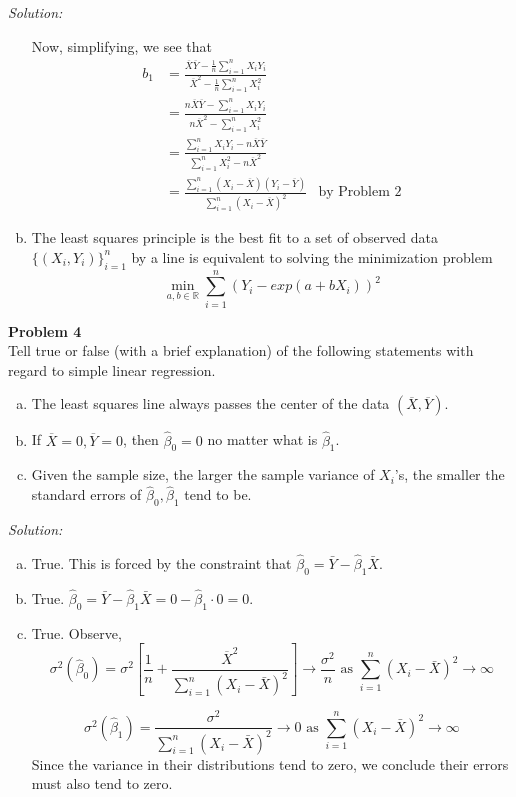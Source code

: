\documentclass{article}
\newenvironment{problem}[2][Problem]
    { \begin{mdframed}[backgroundcolor=gray!20] \textbf{#1 #2} \\}
    {  \end{mdframed}}
\newenvironment{solution}
    {\textit{Solution:}}
    {}
\begin{document}
\begin{solution}
\begin{enumerate}[(a)]
Now, simplifying, we see that 
\begin{align*}
b_1 &= \frac{\overline{X}\overline{Y} - \frac{1}{n}\sum_{i = 1}^n X_i Y_i }{\overline{X}^2 - \frac{1}{n}\sum_{i = 1}^n X_i^2 } \\
&= \frac{n \overline{X}\overline{Y} - \sum_{i = 1}^n X_i Y_i }{n \overline{X}^2 - \sum_{i = 1}^n X_i^2 } \\
&=  \frac{ \sum_{i = 1}^n X_i Y_i - n \overline{X}\overline{Y} }{ \sum_{i = 1}^n X_i^2 - n \overline{X}^2} \\
&=  \frac{\sum_{i = 1}^n (X_i - \overline{X}) (Y_i - \overline{Y})}{ \sum_{i = 1}^n (X_i - \overline{X})^2} & \text{by Problem 2}
\end{align*}
\item The least squares principle is the best fit to a set of observed data $\{ (X_i, Y_i) \}_{i = 1}^n$ by a line is equivalent to solving the minimization problem 
$$\min_{a, b \in \mathbb R} \sum_{i = 1}^n (Y_i - exp(a + b X_i))^2$$
\end{enumerate}
\end{solution}


\begin{problem}{4}
Tell true or false (with a brief explanation) of the following statements with regard to
simple linear regression.
\begin{enumerate}[(a)]
\item The least squares line always passes the center of the data $(\overline{X} , \overline{Y} )$.
\item If $\overline{X} = 0, \overline{Y} = 0$, then $\hat \beta_0 = 0$ no matter what is $\hat \beta_1$.
\item Given the sample size, the larger the sample variance of $X_i$'s, the smaller the standard
errors of $\hat \beta_0, \hat \beta_1$ tend to be.
\end{enumerate}
\end{problem}
\begin{solution}
\begin{enumerate}[(a)]
\item True. This is forced by the constraint that $\hat \beta_0 = \bar Y  -\hat \beta_1 \bar X$.
\item True. $\hat \beta_0 = \bar Y  -\hat \beta_1 \bar X = 0 - \hat \beta_1 \cdot 0 = 0.$ 
\item True. Observe, 
$$\sigma^2(\hat \beta_0) = \sigma^2 \left [\frac{1}{n} + \frac{\overline X^2}{\sum_{i = 1}^n (X_i - \bar X)^2} \right] \rightarrow \frac{\sigma^2}{n} \text{ as } \sum_{i = 1}^n (X_i - \bar X)^2 \rightarrow \infty$$ 

$$\sigma^2(\hat \beta_1) =\frac{ \sigma^2} {\sum_{i = 1}^n (X_i - \bar X)^2}  \rightarrow 0 \text{ as } \sum_{i = 1}^n (X_i - \bar X)^2 \rightarrow \infty$$ 
Since the variance in their distributions tend to zero, we conclude their errors must also tend to zero. 
\end{enumerate}
\end{solution}
\end{document}
